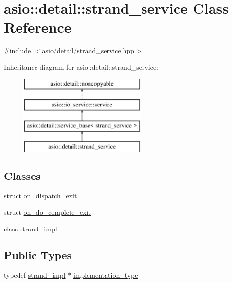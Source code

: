 \hypertarget{classasio_1_1detail_1_1strand__service}{}\section{asio\+:\+:detail\+:\+:strand\+\_\+service Class Reference}
\label{classasio_1_1detail_1_1strand__service}


{\ttfamily \#include $<$asio/detail/strand\+\_\+service.\+hpp$>$}

Inheritance diagram for asio\+:\+:detail\+:\+:strand\+\_\+service\+:\begin{figure}[H]
\begin{center}
\leavevmode
\includegraphics[height=4.000000cm]{classasio_1_1detail_1_1strand__service}
\end{center}
\end{figure}
\subsection*{Classes}
\begin{DoxyCompactItemize}
\item 
struct \hyperlink{structasio_1_1detail_1_1strand__service_1_1on__dispatch__exit}{on\+\_\+dispatch\+\_\+exit}
\item 
struct \hyperlink{structasio_1_1detail_1_1strand__service_1_1on__do__complete__exit}{on\+\_\+do\+\_\+complete\+\_\+exit}
\item 
class \hyperlink{classasio_1_1detail_1_1strand__service_1_1strand__impl}{strand\+\_\+impl}
\end{DoxyCompactItemize}
\subsection*{Public Types}
\begin{DoxyCompactItemize}
\item 
typedef \hyperlink{classasio_1_1detail_1_1strand__service_1_1strand__impl}{strand\+\_\+impl} $\ast$ \hyperlink{classasio_1_1detail_1_1strand__service_ae3f87cc0ee8977c0ed0ee8e35ebe2491}{implementation\+\_\+type}
\end{DoxyCompactItemize}
